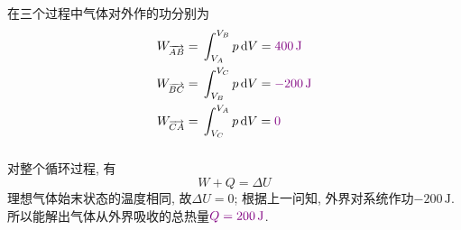\documentclass[12pt]{ctexart}
\begin{document}
\subsubsection{}
在三个过程中气体对外作的功分别为
\begin{align*}
	W_{\overrightarrow{AB}}={}&\int_{V_{A}}^{V_{B}}p\dd{V}=\color{violet}400\,\mathrm{J}\\
	W_{\overrightarrow{BC}}={}&\int_{V_{B}}^{V_{C}}p\dd{V}=\color{violet}-200\,\mathrm{J}\\
	W_{\overrightarrow{CA}}={}&\int_{V_{C}}^{V_{A}}p\dd{V}=\color{violet}0
\end{align*}
\subsubsection{}
对整个循环过程, 有
\[W+Q=\Delta U\]
理想气体始末状态的温度相同, 故$\Delta U=0$; 根据上一问知, 外界对系统作功$-200\,\mathrm{J}$. 所以能解出气体从外界吸收的总热量$\color{violet}Q=200\,\mathrm{J}$.\par
\end{document}
